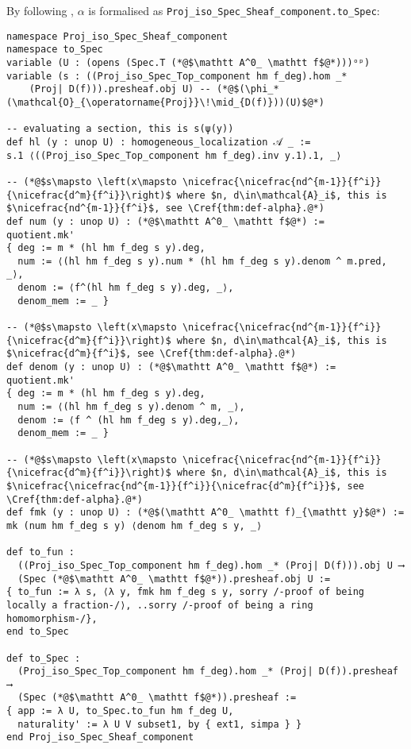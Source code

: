 \documentclass[a4paper,UKenglish,cleveref, autoref, thm-restate]{lipics-v2021}
\begin{document}
By following , $\alpha$ is formalised as \lstinline{Proj_iso_Spec_Sheaf_component.to_Spec}:
\begin{lstlisting}
namespace Proj_iso_Spec_Sheaf_component
namespace to_Spec
variable (U : (opens (Spec.T (*@$\mathtt A^0_ \mathtt f$@*)))ᵒᵖ)
variable (s : ((Proj_iso_Spec_Top_component hm f_deg).hom _* 
    (Proj| D(f))).presheaf.obj U) -- (*@$(\phi_* (\mathcal{O}_{\operatorname{Proj}}\!\mid_{D(f)}))(U)$@*)

-- evaluating a section, this is s(ψ(y))
def hl (y : unop U) : homogeneous_localization 𝒜 _ :=
s.1 ⟨((Proj_iso_Spec_Top_component hm f_deg).inv y.1).1, _⟩

-- (*@$s\mapsto \left(x\mapsto \nicefrac{\nicefrac{nd^{m-1}}{f^i}}{\nicefrac{d^m}{f^i}}\right)$ where $n, d\in\mathcal{A}_i$, this is $\nicefrac{nd^{m-1}}{f^i}$, see \Cref{thm:def-alpha}.@*)
def num (y : unop U) : (*@$\mathtt A^0_ \mathtt f$@*) :=
quotient.mk'
{ deg := m * (hl hm f_deg s y).deg,
  num := ⟨(hl hm f_deg s y).num * (hl hm f_deg s y).denom ^ m.pred, _⟩,
  denom := ⟨f^(hl hm f_deg s y).deg, _⟩,
  denom_mem := _ }

-- (*@$s\mapsto \left(x\mapsto \nicefrac{\nicefrac{nd^{m-1}}{f^i}}{\nicefrac{d^m}{f^i}}\right)$ where $n, d\in\mathcal{A}_i$, this is $\nicefrac{d^m}{f^i}$, see \Cref{thm:def-alpha}.@*)
def denom (y : unop U) : (*@$\mathtt A^0_ \mathtt f$@*) :=
quotient.mk'
{ deg := m * (hl hm f_deg s y).deg,
  num := ⟨(hl hm f_deg s y).denom ^ m, _⟩,
  denom := ⟨f ^ (hl hm f_deg s y).deg,_⟩,
  denom_mem := _ }

-- (*@$s\mapsto \left(x\mapsto \nicefrac{\nicefrac{nd^{m-1}}{f^i}}{\nicefrac{d^m}{f^i}}\right)$ where $n, d\in\mathcal{A}_i$, this is $\nicefrac{\nicefrac{nd^{m-1}}{f^i}}{\nicefrac{d^m}{f^i}}$, see \Cref{thm:def-alpha}.@*)
def fmk (y : unop U) : (*@$(\mathtt A^0_ \mathtt f)_{\mathtt y}$@*) :=
mk (num hm f_deg s y) ⟨denom hm f_deg s y, _⟩

def to_fun : 
  ((Proj_iso_Spec_Top_component hm f_deg).hom _* (Proj| D(f))).obj U ⟶ 
  (Spec (*@$\mathtt A^0_ \mathtt f$@*)).presheaf.obj U :=
{ to_fun := λ s, ⟨λ y, fmk hm f_deg s y, sorry /-proof of being locally a fraction-/⟩, ..sorry /-proof of being a ring homomorphism-/},
end to_Spec

def to_Spec :
  (Proj_iso_Spec_Top_component hm f_deg).hom _* (Proj| D(f)).presheaf ⟶
  (Spec (*@$\mathtt A^0_ \mathtt f$@*)).presheaf :=
{ app := λ U, to_Spec.to_fun hm f_deg U,
  naturality' := λ U V subset1, by { ext1, simpa } }
end Proj_iso_Spec_Sheaf_component
\end{lstlisting}
\end{document}
